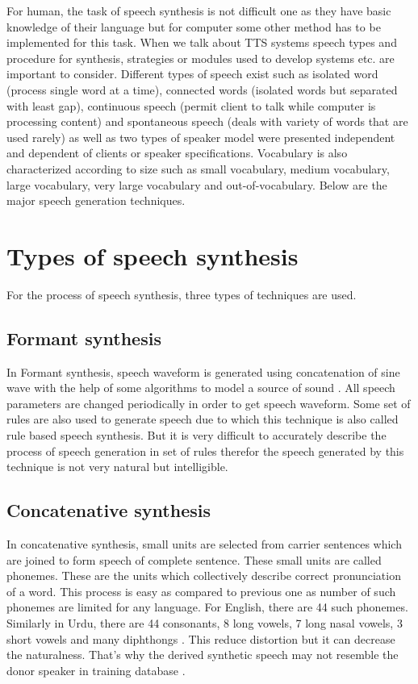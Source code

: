 For human, the task of speech synthesis is not difficult one as they have basic knowledge of their
language but for computer some other method has to be implemented for this task. When we talk about TTS systems speech types
and procedure for synthesis, strategies or modules used to develop systems etc. are important to
consider. Different types of speech exist such as isolated word (process single word at a time),
connected words (isolated words but separated with least gap), continuous speech (permit client
to talk while computer is processing content) and spontaneous speech (deals with variety of words
that are used rarely) as well as two types of speaker model were presented independent and
dependent of clients or speaker specifications. Vocabulary is also characterized according to size
such as small vocabulary, medium vocabulary, large vocabulary, very large vocabulary and out-of-vocabulary.
Below are the major speech generation techniques.

\section{Types of speech synthesis}
For the process of speech synthesis, three types of techniques are used.

\subsection{Formant synthesis}
In Formant synthesis, speech waveform is generated using concatenation of sine wave with the help of some algorithms to model a source of sound \cite{format_synthesis}. All speech parameters are changed periodically in order to get speech waveform. Some set of rules are also used to generate speech due to which this technique is also called rule based speech synthesis. But it is very difficult to accurately describe the process of speech generation in set of rules therefor the speech generated by this technique is not very natural but intelligible.

\subsection{Concatenative synthesis}
In concatenative synthesis, small units are selected from carrier sentences which are joined to form
speech of complete sentence. These small units are called phonemes. These are the units which
collectively describe correct pronunciation of a word. This process is easy as compared to previous one
as number of such phonemes are limited for any language. For English, there are 44 such phonemes.
Similarly in Urdu, there are 44 consonants, 8 long vowels, 7 long nasal vowels, 3 short vowels and many
diphthongs \cite{saleem2002urdu}. This reduce distortion but it can decrease the naturalness.
That’s why the derived synthetic speech may not resemble the donor speaker in training database \cite{huang1996whistler}.

